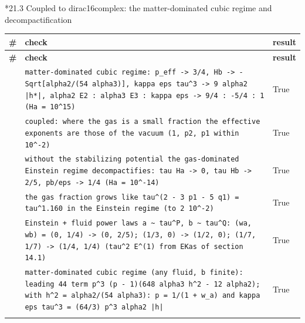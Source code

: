 \documentclass[10pt,a4paper]{article}
\makeatletter
\renewcommand\subsubsection{\@startsection{subsubsection}{3}{\z@}{-3.25ex\@plus -1ex \@minus -.2ex}{1.5ex \@plus .2ex}{\normalfont\normalsize\bfseries\raggedright}}
\makeatother
\begin{document}
\subsubsection*{21.3 Coupled to dirac16complex: the matter-dominated cubic regime and decompactification}
{\footnotesize
\begin{longtable}{>{\raggedright\arraybackslash}p{}>{\raggedright\arraybackslash}p{}>{\raggedright\arraybackslash}p{}}
\toprule
\textbf{\#} & \textbf{check} & \textbf{result} \\
\midrule\endfirsthead
\toprule
\textbf{\#} & \textbf{check} & \textbf{result} \\
\midrule\endhead
\endfoot
\bottomrule\endlastfoot
377 & \texttt{matter-dominated cubic regime: p\_\allowbreak{}eff -> 3/\allowbreak{}4, Hb -> -Sqrt[alpha2/\allowbreak{}(54 alpha3)], kappa eps tau\textasciicircum{}3 -> 9 alpha2 |h*|, alpha2 E2 : alpha3 E3 : kappa eps -> 9/\allowbreak{}4 : -5/\allowbreak{}4 : 1 (Ha = 10\textasciicircum{}15)} & True \\
378 & \texttt{coupled: where the gas is a small fraction the effective exponents are those of the vacuum (1, p2, p1 within 10\textasciicircum{}-2)} & True \\
379 & \texttt{without the stabilizing potential the gas-dominated Einstein regime decompactifies: tau Ha -> 0, tau Hb -> 2/\allowbreak{}5, pb/\allowbreak{}eps -> 1/\allowbreak{}4 (Ha = 10\textasciicircum{}-14)} & True \\
380 & \texttt{the gas fraction grows like tau\textasciicircum{}(2 - 3 p1 - 5 q1) = tau\textasciicircum{}1.160 in the Einstein regime (to 2 10\textasciicircum{}-2)} & True \\
381 & \texttt{Einstein + fluid power laws a \textasciitilde{} tau\textasciicircum{}P, b \textasciitilde{} tau\textasciicircum{}Q: (wa, wb) = (0, 1/\allowbreak{}4) -> (0, 2/\allowbreak{}5); (1/\allowbreak{}3, 0) -> (1/\allowbreak{}2, 0); (1/\allowbreak{}7, 1/\allowbreak{}7) -> (1/\allowbreak{}4, 1/\allowbreak{}4) (tau\textasciicircum{}2 E\textasciicircum{}(1) from EKas of section 14.1)} & True \\
382 & \texttt{matter-dominated cubic regime (any fluid, b finite): leading 44 term p\textasciicircum{}3 (p - 1)(648 alpha3 h\textasciicircum{}2 - 12 alpha2); with h\textasciicircum{}2 = alpha2/\allowbreak{}(54 alpha3): p = 1/\allowbreak{}(1 + w\_\allowbreak{}a) and kappa eps tau\textasciicircum{}3 = (64/\allowbreak{}3) p\textasciicircum{}3 alpha2 |h|} & True \\*
\end{longtable}}
\end{document}
